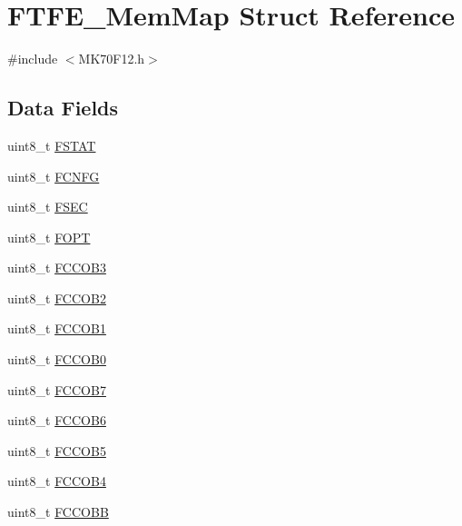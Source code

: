 \hypertarget{struct_f_t_f_e___mem_map}{}\section{F\+T\+F\+E\+\_\+\+Mem\+Map Struct Reference}
\label{struct_f_t_f_e___mem_map}


{\ttfamily \#include $<$M\+K70\+F12.\+h$>$}

\subsection*{Data Fields}
\begin{DoxyCompactItemize}
\item 
uint8\+\_\+t \hyperlink{struct_f_t_f_e___mem_map_a7e8a4e06df758e3dc251260d71818be8}{F\+S\+T\+A\+T}
\item 
uint8\+\_\+t \hyperlink{struct_f_t_f_e___mem_map_ac8a0419a834abb8966d8ca7d18384d7e}{F\+C\+N\+F\+G}
\item 
uint8\+\_\+t \hyperlink{struct_f_t_f_e___mem_map_a6111e18f3da7c8c12b1fdc2e584a74be}{F\+S\+E\+C}
\item 
uint8\+\_\+t \hyperlink{struct_f_t_f_e___mem_map_af24ed572a9a06cefc7c238c08e2aa332}{F\+O\+P\+T}
\item 
uint8\+\_\+t \hyperlink{struct_f_t_f_e___mem_map_a0d9b934b80cc5802632699a965acb08c}{F\+C\+C\+O\+B3}
\item 
uint8\+\_\+t \hyperlink{struct_f_t_f_e___mem_map_a3ee3dde0b1da6205c9cbc4a8aba737ee}{F\+C\+C\+O\+B2}
\item 
uint8\+\_\+t \hyperlink{struct_f_t_f_e___mem_map_ab72be9c808d3ff0a1e61da8c56f59289}{F\+C\+C\+O\+B1}
\item 
uint8\+\_\+t \hyperlink{struct_f_t_f_e___mem_map_abea6e1649d554a8c0da79bdd0d59c42a}{F\+C\+C\+O\+B0}
\item 
uint8\+\_\+t \hyperlink{struct_f_t_f_e___mem_map_ab092d215fb23493ba64935d87da1cf73}{F\+C\+C\+O\+B7}
\item 
uint8\+\_\+t \hyperlink{struct_f_t_f_e___mem_map_a4c1e73e990e9c1b2db59498c66edf114}{F\+C\+C\+O\+B6}
\item 
uint8\+\_\+t \hyperlink{struct_f_t_f_e___mem_map_a07c24a4727fa6aef7cb9a3119c5bf39a}{F\+C\+C\+O\+B5}
\item 
uint8\+\_\+t \hyperlink{struct_f_t_f_e___mem_map_a67f74d54b4ea83300912bfd3fd13f69c}{F\+C\+C\+O\+B4}
\item 
uint8\+\_\+t \hyperlink{struct_f_t_f_e___mem_map_a1eed87dc0da91bf3023c90b7fcd894f4}{F\+C\+C\+O\+B\+B}

\end{DoxyCompactItemize}
